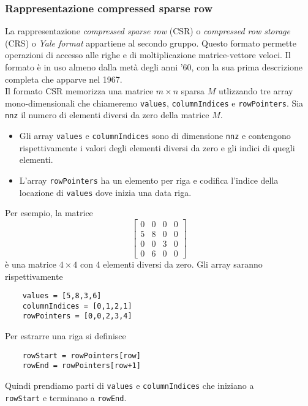 \documentclass[12pt]{article}
\begin{document}
\subsubsection{Rappresentazione compressed sparse row}
La rappresentazione \textit{compressed sparse row} (CSR) o \textit{compressed row storage} (CRS) o \textit{Yale format} appartiene al secondo gruppo. Questo formato permette operazioni di accesso alle righe e di moltiplicazione matrice-vettore veloci. Il formato è in uso almeno dalla metà degli anni '60, con la sua prima descrizione completa che apparve nel 1967.\\
Il formato CSR memorizza una matrice \(m \times n\) sparsa \(M\) utlizzando tre array mono-dimensionali che chiameremo \texttt{values}, \texttt{columnIndices} e \texttt{rowPointers}. Sia \texttt{nnz} il numero di elementi diversi da zero della matrice \(M\).
\begin{itemize}
    \item Gli array \texttt{values} e \texttt{columnIndices} sono di dimensione \texttt{nnz} e contengono rispettivamente i valori degli elementi diversi da zero e gli indici di quegli elementi.
    \item L'array \texttt{rowPointers} ha un elemento per riga e codifica l'indice della locazione di \texttt{values} dove inizia una data riga.
\end{itemize}
Per esempio, la matrice
\begin{equation*}
   \left[
    \begin{matrix}
        0 & 0 & 0 & 0 \\
        5 & 8 & 0 & 0 \\
        0 & 0 & 3 & 0 \\
        0 & 6 & 0 & 0 
    \end{matrix}
    \right]
\end{equation*}
è una matrice \(4 \times 4\) con 4 elementi diversi da zero. Gli array saranno rispettivamente
\begin{verbatim}
    values = [5,8,3,6]
    columnIndices = [0,1,2,1]
    rowPointers = [0,0,2,3,4]
\end{verbatim}
Per estrarre una riga si definisce
\begin{verbatim}
    rowStart = rowPointers[row]
    rowEnd = rowPointers[row+1]
\end{verbatim}
Quindi prendiamo parti di \texttt{values} e \texttt{columnIndices} che iniziano a\\\texttt{rowStart} e terminano a \texttt{rowEnd}.\\
\end{document}
